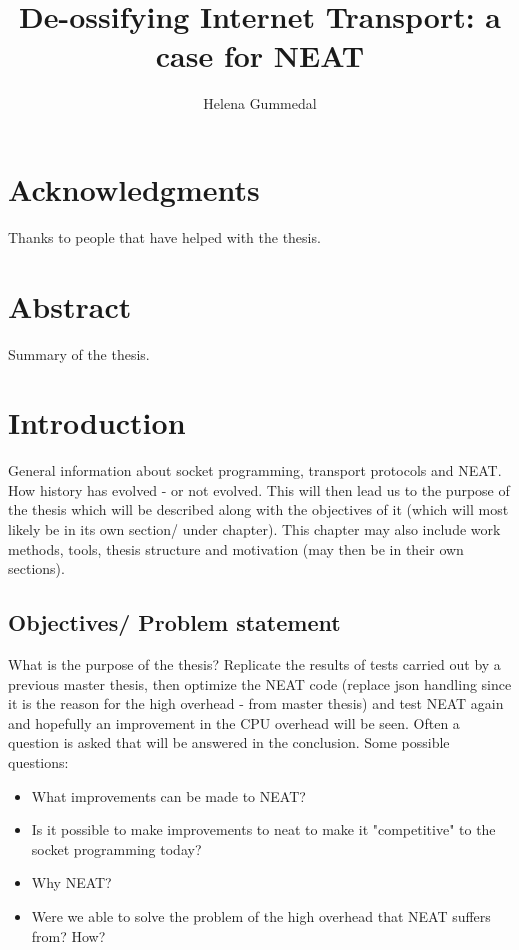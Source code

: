 \documentclass[12pt]{report}
\title{De-ossifying Internet Transport: a case for NEAT}
\author{
	Helena Gummedal
}
\begin{document}
\maketitle

\chapter*{Acknowledgments}%
Thanks to people that have helped with the thesis.

\chapter*{Abstract}%
Summary of the thesis.

\tableofcontents

\chapter{Introduction}
General information about socket programming, transport protocols and NEAT. How history has evolved - or not evolved. This will then lead us to the purpose of the thesis which will be described along with the objectives of it (which will most likely be in its own section/ under chapter). This chapter may also include work methods, tools, thesis structure and motivation (may then be in their own sections).

\section{Objectives/ Problem statement}
What is the purpose of the thesis? Replicate the results of tests carried out by a previous master thesis, then optimize the NEAT code (replace json handling since it is the reason for the high overhead - from master thesis) and test NEAT again and hopefully an improvement in the CPU overhead will be seen. Often a question is asked that will be answered in the conclusion. Some possible questions: 
\begin{itemize}
\item What improvements can be made to NEAT?
\item Is it possible to make improvements to neat to make it "competitive" to the socket programming today?
\item Why NEAT?
\item Were we able to solve the problem of the high overhead that NEAT suffers from? How?
\end{itemize}
\end{document}
